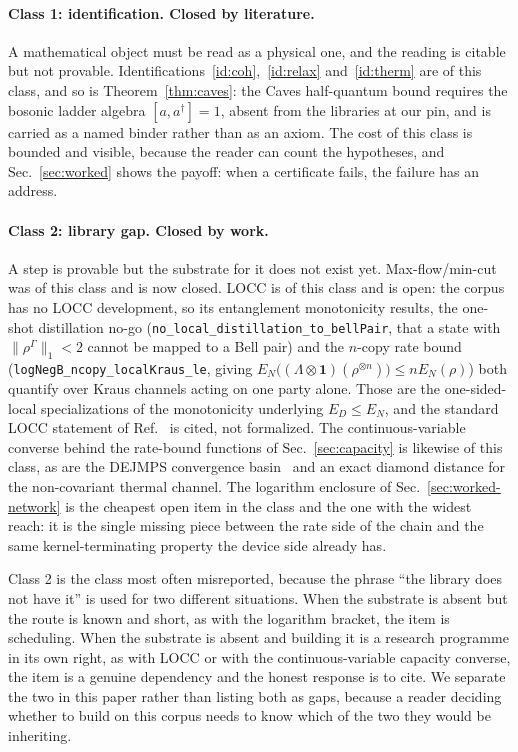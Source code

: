 \documentclass[aps,pra,reprint,nofootinbib,superscriptaddress]{revtex4-2}
\theoremstyle{plain}
\theoremstyle{definition}
\theoremstyle{remark}
\newcommand{\lean}[1]{\texttt{#1}}
\newcommand{\trnorm}[1]{\lVert #1 \rVert_{1}}
\begin{document}
\paragraph*{Class 1: identification. Closed by literature.} A
mathematical object must be read as a physical one, and the reading is
citable but not provable. Identifications~\ref{id:coh},~\ref{id:relax}
and~\ref{id:therm} are of this class, and so is
Theorem~\ref{thm:caves}: the Caves half-quantum bound requires the
bosonic ladder algebra $[a,a^{\dagger}]=1$, absent from the libraries at
our pin, and is carried as a named binder rather than as an axiom. The
cost of this class is bounded and visible, because the reader can count
the hypotheses, and Sec.~\ref{sec:worked} shows the payoff: when a
certificate fails, the failure has an address.

\paragraph*{Class 2: library gap. Closed by work.} A step is provable
but the substrate for it does not exist yet. Max-flow/min-cut was of this
class and is now closed. LOCC is of this class and is open: the corpus
has no LOCC development, so its entanglement monotonicity results, the
one-shot distillation no-go (\lean{no\_local\_distillation\_to\_bellPair},
that a state with $\trnorm{\rho^{\Gamma}} < 2$ cannot be mapped to a Bell
pair) and the $n$-copy rate bound
(\lean{logNegB\_ncopy\_localKraus\_le}, giving
$E_N\big((\Lambda\otimes\mathbf 1)(\rho^{\otimes n})\big) \le n E_N(\rho)$)
both quantify over Kraus channels acting on one party alone. Those are
the one-sided-local specializations of the monotonicity underlying
$E_D \le E_N$, and the standard LOCC statement of
Ref.~\cite{VidalWerner2002} is cited, not formalized. The
continuous-variable converse behind the rate-bound functions of
Sec.~\ref{sec:capacity} is likewise of this class, as are the DEJMPS
convergence basin~\cite{Macchiavello1998} and an exact diamond distance
for the non-covariant thermal channel. The logarithm enclosure of
Sec.~\ref{sec:worked-network} is the cheapest open item in the class and
the one with the widest reach: it is the single missing piece between the
rate side of the chain and the same kernel-terminating property the
device side already has.

Class 2 is the class most often misreported, because the phrase ``the
library does not have it'' is used for two different situations. When the
substrate is absent but the route is known and short, as with the
logarithm bracket, the item is scheduling. When the substrate is absent
and building it is a research programme in its own right, as with LOCC or
with the continuous-variable capacity converse, the item is a genuine
dependency and the honest response is to cite. We separate the two in
this paper rather than listing both as gaps, because a reader deciding
whether to build on this corpus needs to know which of the two they would
be inheriting.
\end{document}
